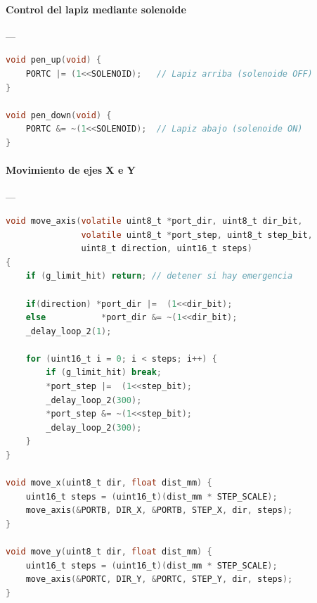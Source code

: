 \paragraph{Control del lapiz mediante solenoide}\label{anexo:P3_pen_control}---\\
\begin{lstlisting}[language=C, caption={Funciones de control del lapiz (solenoide).}]
void pen_up(void) {
    PORTC |= (1<<SOLENOID);   // Lapiz arriba (solenoide OFF)
}

void pen_down(void) {
    PORTC &= ~(1<<SOLENOID);  // Lapiz abajo (solenoide ON)
}
\end{lstlisting}

\paragraph{Movimiento de ejes X e Y}\label{anexo:P4_move_axis}---\\
\begin{lstlisting}[language=C, caption={Movimiento de ejes controlado por tren de pulsos.}]
void move_axis(volatile uint8_t *port_dir, uint8_t dir_bit,
               volatile uint8_t *port_step, uint8_t step_bit,
               uint8_t direction, uint16_t steps)
{
    if (g_limit_hit) return; // detener si hay emergencia

    if(direction) *port_dir |=  (1<<dir_bit);
    else           *port_dir &= ~(1<<dir_bit);
    _delay_loop_2(1);

    for (uint16_t i = 0; i < steps; i++) {
        if (g_limit_hit) break;
        *port_step |=  (1<<step_bit);
        _delay_loop_2(300);
        *port_step &= ~(1<<step_bit);
        _delay_loop_2(300);
    }
}

void move_x(uint8_t dir, float dist_mm) {
    uint16_t steps = (uint16_t)(dist_mm * STEP_SCALE);
    move_axis(&PORTB, DIR_X, &PORTB, STEP_X, dir, steps);
}

void move_y(uint8_t dir, float dist_mm) {
    uint16_t steps = (uint16_t)(dist_mm * STEP_SCALE);
    move_axis(&PORTC, DIR_Y, &PORTC, STEP_Y, dir, steps);
}
\end{lstlisting}

